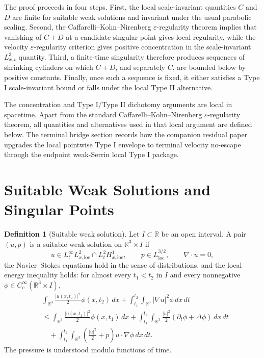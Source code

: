 \documentclass[11pt]{amsart}
\theoremstyle{plain}
\theoremstyle{definition}
\newtheorem{definition}[definition]{Definition}
\theoremstyle{remark}
\begin{document}
The proof proceeds in four steps.  First, the local scale-invariant
quantities \(C\) and \(D\) are finite for suitable weak solutions and invariant
under the usual parabolic scaling.  Second, the Caffarelli--Kohn--Nirenberg
\(\varepsilon\)-regularity theorem implies that vanishing of \(C+D\) at a
candidate singular point gives local regularity, while the velocity
\(\varepsilon\)-regularity criterion gives positive concentration in the
scale-invariant \(L^3_{x,t}\) quantity.  Third, a finite-time singularity
therefore produces sequences of shrinking cylinders on which \(C+D\), and
separately \(C\), are bounded below by positive constants.  Finally, once such
a sequence is fixed, it either satisfies a Type I scale-invariant bound or
falls under the local Type II alternative.

The concentration and Type I/Type II dichotomy arguments are local in
spacetime.  Apart from the standard Caffarelli--Kohn--Nirenberg
\(\varepsilon\)-regularity theorem, all quantities and alternatives used in
that local argument are defined below.  The terminal bridge section records how
the companion residual paper upgrades the local pointwise Type I envelope to
terminal velocity no-escape through the endpoint weak-Serrin local Type I
package.

\section{Suitable Weak Solutions and Singular Points}

\begin{definition}[Suitable weak solution]
Let \(I\subset\mathbb R\) be an open interval.  A pair \((u,p)\) is a suitable
weak solution on \(\mathbb R^3\times I\) if
\[
  u\in L^\infty_tL^2_{x,\mathrm{loc}}
  \cap L^2_tH^1_{x,\mathrm{loc}},
  \qquad
  p\in L^{3/2}_{\mathrm{loc}},
  \qquad
  \nabla\cdot u=0,
\]
the Navier--Stokes equations hold in the sense of distributions, and the local
energy inequality holds: for almost every \(t_1<t_2\) in \(I\) and every
nonnegative \(\phi\in C_c^\infty(\mathbb R^3\times I)\),
\[
\begin{aligned}
&\int_{\mathbb R^3}\frac{|u(x,t_2)|^2}{2}\phi(x,t_2)\,dx
 +\int_{t_1}^{t_2}\int_{\mathbb R^3}|\nabla u|^2\phi\,dx\,dt \\
&\le
 \int_{\mathbb R^3}\frac{|u(x,t_1)|^2}{2}\phi(x,t_1)\,dx
 +\int_{t_1}^{t_2}\int_{\mathbb R^3}
   \frac{|u|^2}{2}(\partial_t\phi+\Delta\phi)\,dx\,dt \\
&\quad
 +\int_{t_1}^{t_2}\int_{\mathbb R^3}
   \left(\frac{|u|^2}{2}+p\right)u\cdot\nabla\phi\,dx\,dt .
\end{aligned}
\]
The pressure is understood modulo functions of time.
\end{definition}
\end{document}
